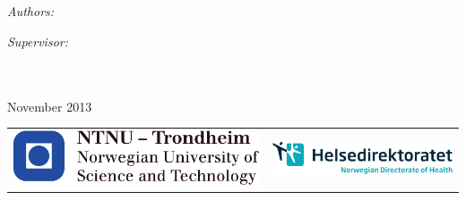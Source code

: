 \documentclass[11pt, a4paper, oneside]{Thesis} %
\begin{document}
\begin{titlepage}
\begin{center}

\textsc{\Large \univname}\\[1cm] %

\HRule \\[0.4cm] %
{\huge \bfseries \ttitle}\\[0.4cm] %
\HRule \\[1.5cm] %
 
\begin{minipage}{0.4\textwidth}
\begin{flushleft} \large
\emph{Authors:}\\
\authornames %
\end{flushleft}
\end{minipage}
\begin{minipage}{0.4\textwidth}
\begin{flushright} \large
\emph{Supervisor:} \\
\supname %
\end{flushright}
\end{minipage}\\[11cm]
\groupname\\
 
{\large November 2013}\\[1cm] %

\begin{tabular}{lr}
   \includegraphics[scale=0.6]{./Figures/NTNU-logo.pdf} 
   \hspace{3 cm} &
   \includegraphics[scale=0.9]{./Figures/HDIR-LOGO-HORISONTAL-ENG-CMYK.pdf} \\
\end{tabular}
\end{center}
\end{titlepage}
\clearpage %
\end{document}
